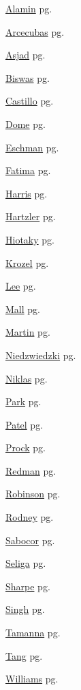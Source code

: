 \item \hyperlink{Alamin.1}{Alamin} pg. \pageref{abs:Alamin}
\item \hyperlink{Arcecubas.1}{Arcecubas} pg. \pageref{abs:Arcecubas}
\item \hyperlink{Asjad.1}{Asjad} pg. \pageref{abs:Asjad}
\item \hyperlink{Biswas.1}{Biswas} pg. \pageref{abs:Biswas}
\item \hyperlink{Castillo.1}{Castillo} pg. \pageref{abs:Castillo}
\item \hyperlink{Dome.1}{Dome} pg. \pageref{abs:Dome}
\item \hyperlink{Eschman.1}{Eschman} pg. \pageref{abs:Eschman}
\item \hyperlink{Fatima.1}{Fatima} pg. \pageref{abs:Fatima}
\item \hyperlink{Harris.1}{Harris} pg. \pageref{abs:Harris}
\item \hyperlink{Hartzler.1}{Hartzler} pg. \pageref{abs:Hartzler}
\item \hyperlink{Hiotaky.1}{Hiotaky} pg. \pageref{abs:Hiotaky}
\item \hyperlink{Krozel.1}{Krozel} pg. \pageref{abs:Krozel}
\item \hyperlink{Lee.1}{Lee} pg. \pageref{abs:Lee}
\item \hyperlink{Mall.1}{Mall} pg. \pageref{abs:Mall}
\item \hyperlink{Martin.1}{Martin} pg. \pageref{abs:Martin}
\item \hyperlink{Niedzwiedzki.1}{Niedzwiedzki} pg. \pageref{abs:Niedzwiedzki}
\item \hyperlink{Niklas.1}{Niklas} pg. \pageref{abs:Niklas}
\item \hyperlink{Park.1}{Park} pg. \pageref{abs:Park}
\item \hyperlink{Patel.1}{Patel} pg. \pageref{abs:Patel}
\item \hyperlink{Prock.1}{Prock} pg. \pageref{abs:Prock}
\item \hyperlink{Redman.1}{Redman} pg. \pageref{abs:Redman}
\item \hyperlink{Robinson.1}{Robinson} pg. \pageref{abs:Robinson}
\item \hyperlink{Rodney.1}{Rodney} pg. \pageref{abs:Rodney}
\item \hyperlink{Sabocor.1}{Sabocor} pg. \pageref{abs:Sabocor}
\item \hyperlink{Seliga.1}{Seliga} pg. \pageref{abs:Seliga}
\item \hyperlink{Sharpe.1}{Sharpe} pg. \pageref{abs:Sharpe}
\item \hyperlink{Singh.1}{Singh} pg. \pageref{abs:Singh}
\item \hyperlink{Tamanna.1}{Tamanna} pg. \pageref{abs:Tamanna}
\item \hyperlink{Tang.1}{Tang} pg. \pageref{abs:Tang}
\item \hyperlink{Williams.1}{Williams} pg. \pageref{abs:Williams}
